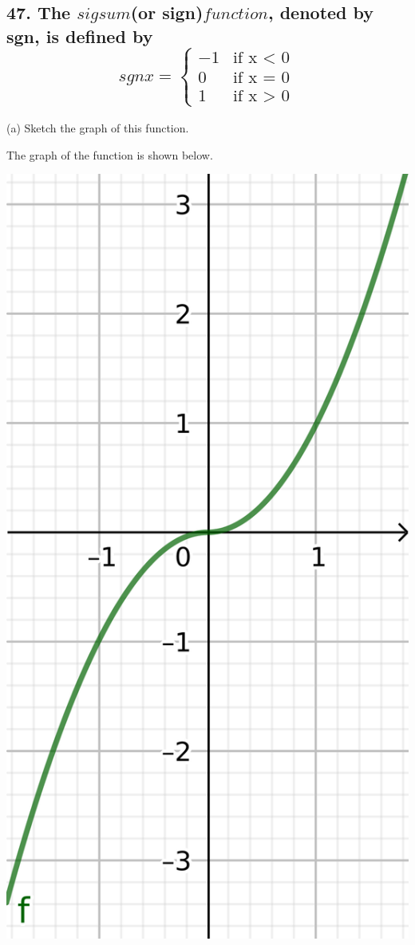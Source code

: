 \documentclass{article}
\begin{document}
    \subsection*{47. The $sigsum$(or sign)$function$, denoted by sgn, is defined by $$sgn x = \left\{ \begin{array}{ll} -1 & \textrm{if x < 0} \\ 0 & \textrm{if x = 0} \\ 1 & \textrm{if x > 0} \end{array} \right.$$}

    (a) Sketch the graph of this function.

    The graph of the function is shown below.

    \includegraphics[scale = 1.7]{geogebra-export.png}
\end{document}
